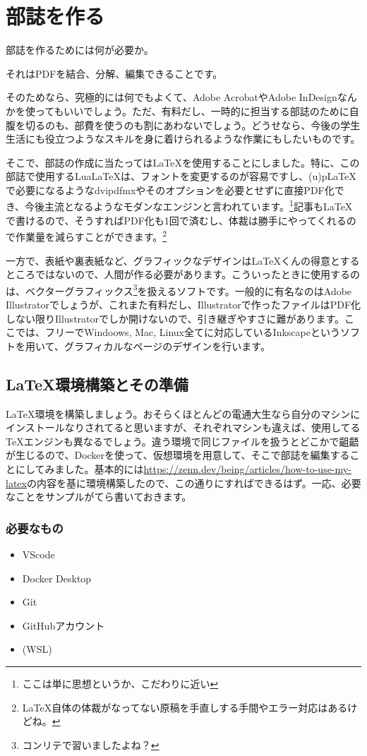 \documentclass[../main]{subfiles}
\begin{document}
\chapter{部誌を作る} %
部誌を作るためには何が必要か。\par
それはPDFを結合、分解、編集できることです。\par
そのためなら、究極的には何でもよくて、Adobe AcrobatやAdobe InDesignなんかを使ってもいいでしょう。ただ、有料だし、一時的に担当する部誌のために自腹を切るのも、部費を使うのも割にあわないでしょう。どうせなら、今後の学生生活にも役立つようなスキルを身に着けられるような作業にもしたいものです。\par
そこで、部誌の作成に当たっては{\LaTeX}を使用することにしました。特に、この部誌で使用する{Lua\LaTeX}は、フォントを変更するのが容易ですし、{(u)p\LaTeX}で必要になるようなdvipdfmxやそのオプションを必要とせずに直接PDF化でき、今後主流となるようなモダンなエンジンと言われています。\footnote{ここは単に思想というか、こだわりに近い}記事も{\LaTeX}で書けるので、そうすればPDF化も1回で済むし、体裁は勝手にやってくれるので作業量を減らすことができます。\footnote{{\LaTeX}自体の体裁がなってない原稿を手直しする手間やエラー対応はあるけどね。}\par
一方で、表紙や裏表紙など、グラフィックなデザインは{\LaTeX}くんの得意とするところではないので、人間が作る必要があります。こういったときに使用するのは、ベクターグラフィックス\footnote{コンリテで習いましたよね？}を扱えるソフトです。一般的に有名なのはAdobe Illustratorでしょうが、これまた有料だし、Illustratorで作ったファイルはPDF化しない限りIllustratorでしか開けないので、引き継ぎやすさに難があります。ここでは、フリーでWindoows, Mac, Linux全てに対応しているInkscapeというソフトを用いて、グラフィカルなページのデザインを行います。
\section{\LaTeX 環境構築とその準備}
\LaTeX 環境を構築しましょう。おそらくほとんどの電通大生なら自分のマシンにインストールなりされてると思いますが、それぞれマシンも違えば、使用してる\TeX エンジンも異なるでしょう。違う環境で同じファイルを扱うとどこかで齟齬が生じるので、Dockerを使って、仮想環境を用意して、そこで部誌を編集することにしてみました。基本的には\url{https://zenn.dev/being/articles/how-to-use-my-latex}の内容を基に環境構築したので、この通りにすればできるはず。一応、必要なことをサンプルがてら書いておきます。

\subsection{必要なもの}
\begin{itemize}
  \item VScode
  \item Docker Desktop
  \item Git
  \item GitHubアカウント
  \item (WSL)
\end{itemize}
\end{document}
